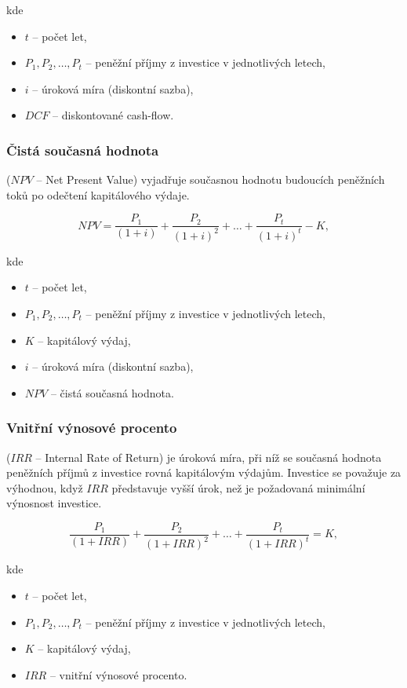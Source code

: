 kde
\begin{itemize}[label={}]
    \item $t$ -- počet let,
    \item $P_1, P_2, \ldots, P_t$ -- peněžní příjmy z investice v jednotlivých letech,
    \item $i$ -- úroková míra (diskontní sazba),
    \item $DCF$ -- diskontované cash-flow.
\end{itemize}

\subsubsection*{Čistá současná hodnota}
($NPV$ -- Net Present Value)
vyjadřuje současnou hodnotu budoucích peněžních toků po odečtení kapitálového výdaje.

\begin{equation}    
NPV = \frac{P_1}{(1+i)} + \frac{P_2}{(1+i)^2} + \ldots + \frac{P_t}{(1+i)^t} - K,
\end{equation}

kde
\begin{itemize}[label={}]
    \item $t$ -- počet let,
    \item $P_1, P_2, \ldots, P_t$ -- peněžní příjmy z investice v jednotlivých letech,
    \item $K$ -- kapitálový výdaj,
    \item $i$ -- úroková míra (diskontní sazba),
    \item $NPV$ -- čistá současná hodnota.
\end{itemize}

\subsubsection*{Vnitřní výnosové procento}
($IRR$ -- Internal Rate of Return)
je úroková míra, při níž se současná hodnota peněžních příjmů z investice rovná kapitálovým výdajům. Investice se považuje za výhodnou, když $IRR$ představuje vyšší úrok, než je požadovaná minimální výnosnost investice.

\begin{equation}
    \frac{P_1}{(1+IRR)} + \frac{P_2}{(1+IRR)^2} + \ldots + \frac{P_t}{(1+IRR)^t} = K,
\end{equation}

kde
\begin{itemize}[label={}]
    \item $t$ -- počet let,
    \item $P_1, P_2, \ldots, P_t$ -- peněžní příjmy z investice v jednotlivých letech,
    \item $K$ -- kapitálový výdaj,
    \item $IRR$ -- vnitřní výnosové procento.
\end{itemize}
